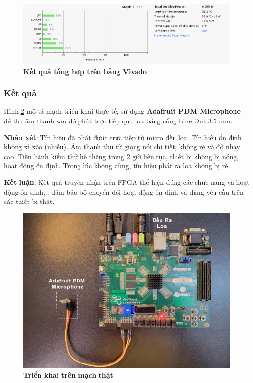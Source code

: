 \begin{figure}[H]
    \centering
    \includegraphics[width=14cm]{Images/Chuong5/fpga/syn_fpga.png}
    \caption[Kết quả tổng hợp trên bằng Vivado]{\bfseries \fontsize{12pt}{0pt}\selectfont Kết quả tổng hợp trên bằng Vivado}
    \label{syn_fpga}
\end{figure}

\subsubsection{Kết quả}

Hình \ref{machthat_2} mô tả mạch triển khai thực tế, sử dụng \textbf{Adafruit PDM Microphone} để thu âm thanh sau đó phát trực tiếp qua loa bằng cổng Line Out 3.5 mm.

\textbf{Nhận xét}: Tín hiệu đã phát được trực tiếp từ micro đến loa. Tín hiệu ổn định không xì xào (nhiễu). Âm thanh thu từ giọng nói chi tiết, không rè và độ nhạy cao. Tiến hành kiểm thử hệ thống trong 2 giờ liên tục, thiết bị không bị nóng, hoạt động ổn định. Trong lúc không dùng, tín hiệu phát ra loa không bị rè.

\textbf{Kết luận}: Kết quả truyền nhận trên FPGA thể hiện đúng các chức năng và hoạt động ổn định,.. đảm bảo bộ chuyển đổi hoạt động ổn định và đúng yêu cầu trên các thiết bị thật.


\begin{figure}[H]
    \centering
    \includegraphics[width=14cm]{Images/Chuong5/fpga/machthat_2.png}
    \caption[Triển khai trên mạch thật]{\bfseries \fontsize{12pt}{0pt}\selectfont Triển khai trên mạch thật}
    \label{machthat_2}
\end{figure}

